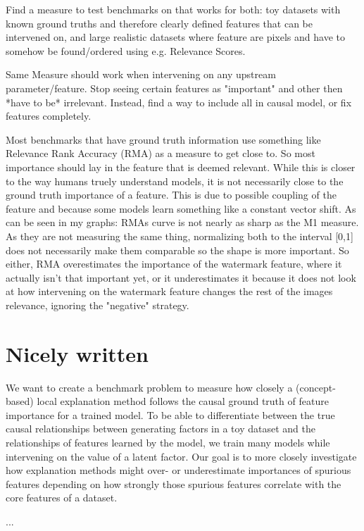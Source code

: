 Find a measure to test benchmarks on that works for both: toy datasets with known ground truths and therefore clearly defined features that can be intervened on, and large realistic datasets where feature are pixels and have to somehow be found/ordered using e.g. Relevance Scores.

Same Measure should work when intervening on any upstream parameter/feature. Stop seeing certain features as "important" and other then *have to be* irrelevant. Instead, find a way to include all in causal model, or fix features completely.

Most benchmarks that have ground truth information use something like Relevance Rank Accuracy (RMA) as a measure to get close to. So most importance should lay in the feature that is deemed relevant. While this is closer to the way humans truely understand models, it is not necessarily close to the ground truth importance of a feature. This is due to possible coupling of the feature and because some models learn something like a constant vector shift. 
As can be seen in my graphs: RMAs curve is not nearly as sharp as the M1 measure. As they are not measuring the same thing, normalizing both to the interval [0,1] does not necessarily make them comparable so the shape is more important. So either, RMA overestimates the importance of the watermark feature, where it actually isn't that important yet, or it underestimates it because it does not look at how intervening on the watermark feature changes the rest of the images relevance, ignoring the "negative" strategy. 

\section{Nicely written}

We want to create a benchmark problem to measure how closely a (concept-based) local explanation method follows the causal ground truth of feature importance for a trained model. 
To be able to differentiate between the true causal relationships between generating factors in a toy dataset and the relationships of features learned by the model, we train many models while intervening on the value of a latent factor. 
Our goal is to more closely investigate how explanation methods might over- or underestimate importances of spurious features depending on how strongly those spurious features correlate with the core features of a dataset. 

...

